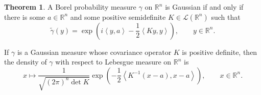 \documentclass{article}
\newcommand{\inner}[2]{\left\langle #1, #2 \right\rangle}
\theoremstyle{definition}
\newtheorem{theorem}{Theorem}
\theoremstyle{definition}
\begin{document}
\begin{theorem}
A Borel probability measure $\gamma$ on $\mathbb{R}^n$ is Gaussian if and only if there is some
$a \in \mathbb{R}^n$ and some positive semidefinite  $K \in \mathscr{L}(\mathbb{R}^n)$ such that
\begin{equation}
\widetilde{\gamma}(y) = \exp\left(i \inner{y}{a} - \frac{1}{2} \inner{Ky}{y} \right), \qquad
y \in \mathbb{R}^n.
\label{GaussianRn}
\end{equation}

If $\gamma$ is a Gaussian measure whose  covariance operator $K$  is positive definite, then 
the density of $\gamma$ with respect to Lebesgue measure on $\mathbb{R}^n$ is 
\[
x \mapsto \frac{1}{\sqrt{(2\pi)^n \det K}} \exp\left(-\frac{1}{2}\inner{K^{-1}(x-a)}{x-a}\right),
\qquad x \in \mathbb{R}^n.
\]
\label{density}
\end{theorem}
\end{document}
